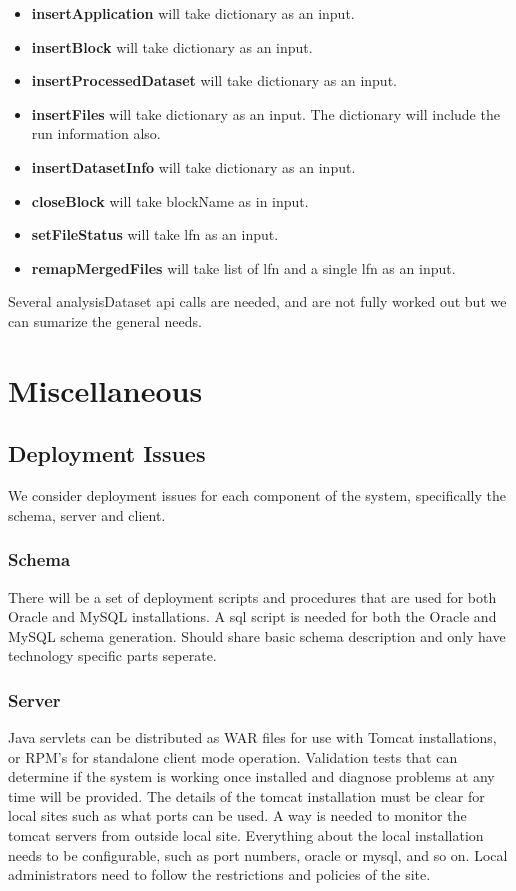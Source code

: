 \documentclass{cmspaper}
\begin{document}
\begin{itemize}
   \item {\bf insertApplication} will take dictionary as an input.
   \item {\bf insertBlock} will take dictionary as an input.
   \item {\bf insertProcessedDataset} will take dictionary as an input.
   \item {\bf insertFiles} will take dictionary as an input. The dictionary will include the run information also.
   \item {\bf insertDatasetInfo} will take dictionary as an input.
   \item {\bf closeBlock} will take blockName as in input.
   \item {\bf setFileStatus} will take lfn as an input.
   \item {\bf remapMergedFiles} will take list of lfn and a single lfn as an input.
\end{itemize}

Several analysisDataset api calls are needed, and are not fully worked out but we can sumarize the general needs.



\section{Miscellaneous}
\subsection{Deployment Issues}
We consider deployment issues for each component of the system, specifically the schema, server and client. 
\subsubsection{Schema}
There will be a set of deployment scripts and procedures that are used for both Oracle and MySQL installations. A sql script is needed for both the Oracle and MySQL schema generation. Should share basic schema description and only have technology specific parts seperate.
   
\subsubsection{Server}
  Java servlets can be distributed as WAR files for use with Tomcat installations,  or  RPM's for standalone client mode operation. Validation tests that can determine if the system is working once installed and diagnose problems at any time will be provided. The details of the tomcat installation must be clear for local sites such as what ports can be used. A way is needed to monitor the tomcat servers from outside local site. Everything about the local installation needs to be configurable, such as port numbers, oracle or mysql, and so on. Local administrators need to follow the restrictions and policies of the site.
\end{document}
